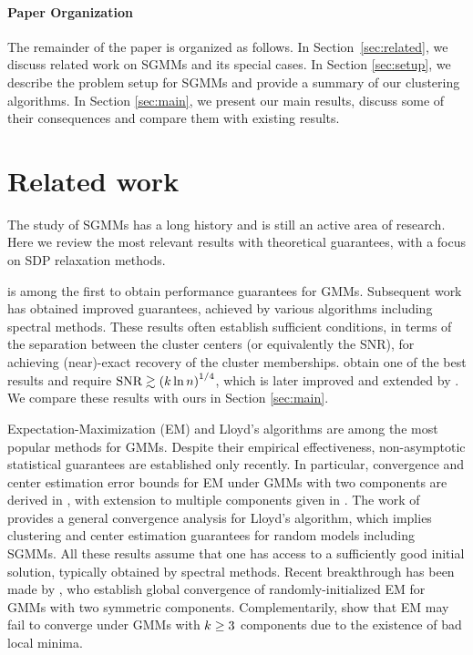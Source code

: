 \paragraph{Paper Organization}

The remainder of the paper is organized as follows. In Section~\ref{sec:related},
we discuss related work on SGMMs and its special cases. In Section
\ref{sec:setup}, we describe the problem setup for SGMMs and provide
a summary of our clustering algorithms. In Section \ref{sec:main},
we present our main results, discuss some of their consequences and
compare them with existing results.

\section{Related work\label{sec:related}}

The study of SGMMs has a long history and is still an active area
of research. Here we review the most relevant results with theoretical
guarantees, with a focus on SDP relaxation methods. 

\citet{dasgupta1999learning} is among the first to obtain performance
guarantees for GMMs. Subsequent work has obtained improved guarantees,
achieved by various algorithms including spectral methods. These results
often establish sufficient conditions, in terms of the separation
between the cluster centers (or equivalently the SNR), for achieving
(near)-exact recovery of the cluster memberships. \citet{vempala2004spectral}
obtain one of the best results and require $\text{SNR}\gtrsim\left(k\ln n\right)^{1/4}$,
which is later improved and extended by \citet{achlioptas2005spectral,kumar2010clustering,awasthi2012improved}.
We compare these results with ours in Section \ref{sec:main}.

Expectation-Maximization (EM) and Lloyd's algorithms are among the
most popular methods for GMMs. Despite their empirical effectiveness,
non-asymptotic statistical guarantees are established only recently.
In particular, convergence and center estimation error bounds for
EM under GMMs with two components are derived in \citet{balakrishnan2017statistical,klusowski2016statistical},
with extension to multiple components given in \citet{yan2017em}.
The work of \citet{lu2016lloyd} provides a general convergence analysis
for Lloyd's algorithm, which implies clustering and center estimation
guarantees for random models including SGMMs. All these results assume
that one has access to a sufficiently good initial solution, typically
obtained by spectral methods. Recent breakthrough has been made by
\citet{daskalakis2016ten,xu2016em}, who establish global convergence
of randomly-initialized EM for GMMs with two symmetric components.
Complementarily, \citet{jin2016local} show that EM may fail to converge
under GMMs with $k\ge3$ components due to the existence of
bad local minima. 

